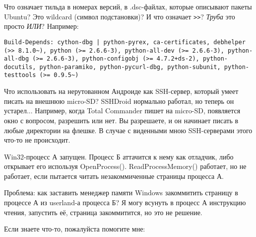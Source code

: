 \myhrule{}

Что означает тильда в номерах версий, в .dsc-файлах, которые описывают пакеты Ubuntu?
Это wildcard (символ подстановки)?
И что означает \verb|>>|?
\emph{Труба} это просто \emph{ИЛИ}?
Например:

\begin{lstlisting}
Build-Depends: cython-dbg | python-pyrex, ca-certificates, debhelper (>> 8.1.0~), python (>= 2.6.6-3), python-all-dev (>= 2.6.6-3), python-all-dbg (>= 2.6.6-3), python-configobj (>= 4.7.2+ds-2), python-docutils, python-paramiko, python-pycurl-dbg, python-subunit, python-testtools (>= 0.9.5~)
\end{lstlisting}

\myhrule{}

Что использовать на нерутованном Андроиде как SSH-сервер, который умеет писать на внешнюю micro-SD?
SSHDroid нормально работал, но теперь он устарел...
Например, когда Total Commander пишет на micro-SD, появляется окно с вопросом, разрешить или нет.
Вы разрешаете, и он начинает писать в любые директории на флешке.
В случае с виденными мною SSH-серверами этого что-то не происходит.

\myhrule{}

Win32-процесс А запущен.
Процесс Б аттачится к нему как отладчик, либо открывает его используя OpenProcess().
ReadProcessMemory() работает, но не работает, если пытается читать незакоммиченные страницы процесса А.

Проблема: как заставить менеджер памяти Windows закоммитить страницу в процессе А из userland-а процесса Б?
Я могу всунуть в процесс А инструкцию чтения, запустить её, страница закоммитится, но это не решение.

\myhrule{}

Если знаете что-то, пожалуйста помогите мне: \EMAIL{}

